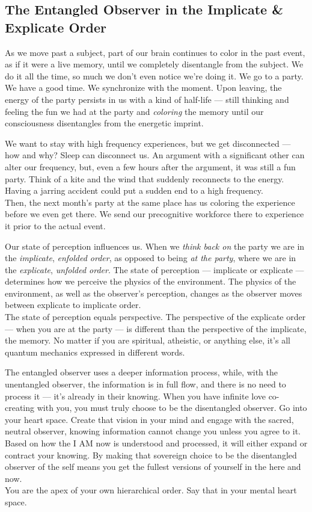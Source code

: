 \subsection{The Entangled Observer in the Implicate \& Explicate
Order}\label{the-entangled-observer-in-the-implicate-explicate-order}

As we move past a subject, part of our brain continues to color in the
past event, as if it were a live memory, until we completely disentangle
from the subject. We do it all the time, so much we don't even notice
we're doing it. We go to a party. We have a good time. We synchronize
with the moment. Upon leaving, the energy of the party persists in us
with a kind of half-life --- still thinking and feeling the fun we had
at the party and \emph{coloring} the memory until our consciousness
disentangles from the energetic imprint.

We want to stay with high frequency experiences, but we get disconnected
--- how and why? Sleep can disconnect us. An argument with a significant
other can alter our frequency, but, even a few hours after the argument,
it was still a fun party. Think of a kite and the wind that suddenly
reconnects to the energy. Having a jarring accident could put a sudden
end to a high frequency.\\
Then, the next month's party at the same place has us coloring the
experience before we even get there. We send our precognitive workforce
there to experience it prior to the actual event.

Our state of perception influences us. When we \emph{think back on} the
party we are in the \emph{implicate}, \emph{enfolded order}, as opposed
to being \emph{at the party}, where we are in the \emph{explicate},
\emph{unfolded order}. The state of perception --- implicate or
explicate --- determines how we perceive the physics of the environment.
The physics of the environment, as well as the observer's perception,
changes as the observer moves between explicate to implicate order.\\
The state of perception equals perspective. The perspective of the
explicate order --- when you are at the party --- is different than the
perspective of the implicate, the memory. No matter if you are
spiritual, atheistic, or anything else, it's all quantum mechanics
expressed in different words.

The entangled observer uses a deeper information process, while, with
the unentangled observer, the information is in full flow, and there is
no need to process it --- it's already in their knowing. When you have
infinite love co-creating with you, you must truly choose to be the
disentangled observer. Go into your heart space. Create that vision in
your mind and engage with the sacred, neutral observer, knowing
information cannot change you unless you agree to it. Based on how the I
AM now is understood and processed, it will either expand or contract
your knowing. By making that sovereign choice to be the disentangled
observer of the self means you get the fullest versions of yourself in
the here and now.\\
You are the apex of your own hierarchical order. Say that in your mental
heart space.

